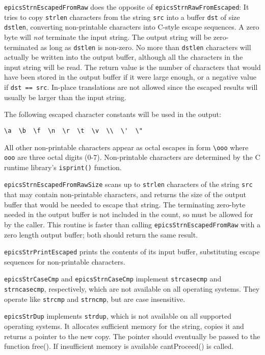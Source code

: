 \verb|epicsStrnEscapedFromRaw| does the opposite of \verb|epicsStrnRawFromEscaped|:
It tries to copy \verb|strlen| characters from the string \verb|src| into a buffer \verb|dst| of size \verb|dstlen|, converting non-printable characters into C-style escape sequences.
A zero byte will \emph{not} terminate the input string.
The output string will be zero-terminated as long as \verb|dstlen| is non-zero.
No more than \verb|dstlen| characters will actually be written into the output buffer, although all the characters in the input string will be read.
The return value is the number of characters that would have been stored in the output buffer if it were large enough, or a negative value if \verb|dst == src|.
In-place translations are not allowed since the escaped results will usually be larger than the input string.

The following escaped character constants will be used in the output:

\begin{verbatim}
\a  \b  \f  \n  \r  \t  \v  \\  \'  \"
\end{verbatim}

All other non-printable characters appear as octal escapes in form \verb|\ooo| where \verb|ooo| are three octal digits (0-7).
Non-printable characters are determined by the C runtime library's \verb|isprint()| function.

\verb|epicsStrnEscapedFromRawSize| scans up to \verb|strlen| characters of the string \verb|src| that may contain non-printable characters, and returns the size of the output buffer that would be needed to escape that string.
The terminating zero-byte needed in the output buffer is not included in the count, so must be allowed for by the caller.
This routine is faster than calling \verb|epicsStrnEscapedFromRaw| with a zero length output buffer; both should return the same result.

\verb|epicsStrPrintEscaped| prints the contents of its input buffer, substituting escape sequences for non-printable characters.

\verb|epicsStrCaseCmp| and \verb|epicsStrnCaseCmp| implement \verb|strcasecmp| and \verb|strncasecmp|, respectively, which are not available on all operating systems.
They operate like \verb|strcmp| and \verb|strncmp|, but are case insensitive.

\verb|epicsStrDup| implements \verb|strdup|, which is not available on all supported operating systems.
It allocates sufficient memory for the string, copies it and returns a pointer to the new copy.
The pointer should eventually be passed to the function free().
If insufficient memory is available cantProceed() is called.

